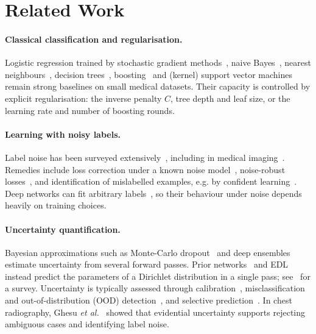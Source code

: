 \documentclass[11pt,a4paper]{article}
\makeatletter
\newcommand{\eg}{e.g.\@\xspace}
\makeatother
\begin{document}
\section{Related Work}
\paragraph{Classical classification and regularisation.}
Logistic regression trained by stochastic gradient methods~\cite{robbins1951stochastic,bottou2010large}, naive
Bayes~\cite{domingos1997optimality}, nearest neighbours~\cite{beyer1999nearest}, decision trees~\cite{breiman1984classification},
boosting~\cite{freund1997decision,friedman2001greedy} and (kernel) support vector machines~\cite{cortes1995support,scholkopf2002learning}
remain strong baselines on small medical datasets. Their capacity is controlled by explicit regularisation: the
inverse penalty $C$, tree depth and leaf size, or the learning rate and number of boosting rounds.

\paragraph{Learning with noisy labels.}
Label noise has been surveyed extensively~\cite{frenay2014classification,song2022learning}, including in medical
imaging~\cite{karimi2020deep}. Remedies include loss correction under a known noise
model~\cite{natarajan2013learning}, noise-robust losses~\cite{ghosh2017robust,zhang2018generalized}, and
identification of mislabelled examples, \eg by confident learning~\cite{northcutt2021confident}. Deep networks can fit
arbitrary labels~\cite{zhang2017understanding}, so their behaviour under noise depends heavily on training choices.

\paragraph{Uncertainty quantification.}
Bayesian approximations such as Monte-Carlo dropout~\cite{gal2016dropout} and deep ensembles~\cite{lakshminarayanan2017simple}
estimate uncertainty from several forward passes. Prior networks~\cite{malinin2018prior} and EDL~\cite{sensoy2018evidential}
instead predict the parameters of a Dirichlet distribution in a single pass; see~\cite{ulmer2023prior} for a survey.
Uncertainty is typically assessed through calibration~\cite{guo2017calibration}, misclassification and
out-of-distribution (OOD) detection~\cite{hendrycks2017baseline}, and selective prediction~\cite{geifman2017selective}.
In chest radiography, Ghesu \emph{et al.}~\cite{ghesu2019quantifying,ghesu2021quantifying} showed that evidential
uncertainty supports rejecting ambiguous cases and identifying label noise.
\end{document}
